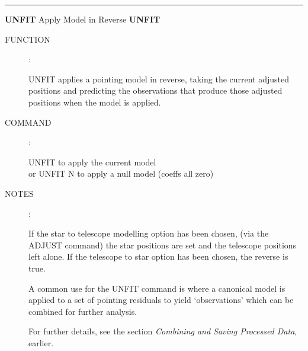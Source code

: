 \goodbreak
\rule{\textwidth}{0.3mm}
{\Large {\bf UNFIT} \hfill Apply Model in Reverse \hfill {\bf UNFIT}}
\begin{description}
\item [FUNCTION]:

UNFIT applies a pointing model in reverse,
taking the current adjusted positions and predicting
the observations that produce those adjusted positions
when the model is applied.

\item [COMMAND]:

\begin{cmd}
\> \> UNFIT \> to apply the current model \\
\> or \> UNFIT N \> to apply a null model (coeffs all zero)
\end{cmd}

\item [NOTES]:

If the star to telescope modelling option has been chosen,
(via the ADJUST command) the star positions are set and the
telescope positions left alone.  If the telescope to star
option has been chosen, the reverse is true.

A common use for the UNFIT command
is where a canonical model is
applied to a set of pointing residuals to yield
`observations' which can be combined for further
analysis.

For further details, see the section {\it Combining and Saving
Processed Data}, earlier.

\end{description}


